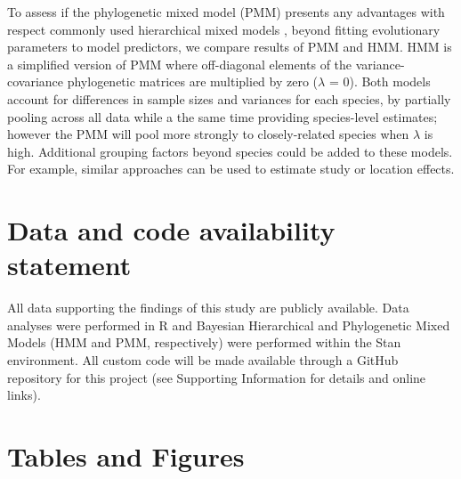 \documentclass[11pt]{article}
\begin{document}
To assess if the phylogenetic mixed model (PMM) presents any advantages with respect commonly used hierarchical mixed models \citep[HMM; see e.g., ][]{ettinger2020}, beyond fitting evolutionary parameters to model predictors, we compare results of PMM and HMM. HMM is a simplified version of PMM where off-diagonal elements of the variance-covariance phylogenetic matrices are multiplied by zero ($\lambda$ = 0). Both models account for differences in sample sizes and variances for each species, by partially pooling across all data while a the same time providing species-level estimates; however the PMM will pool more strongly to closely-related species when $\lambda$ is high. Additional grouping factors beyond species could be added to these models. For example, similar approaches can be used to estimate study or location effects. %





\section*{Data and code availability statement}
All data supporting the findings of this study are publicly available. Data analyses were performed in R and Bayesian Hierarchical and Phylogenetic Mixed Models (HMM and PMM, respectively) were performed within the Stan environment. All custom code will be made available through a GitHub repository for this project (see Supporting Information for details and online links).


\clearpage
\section*{Tables and Figures} 
\end{document}
